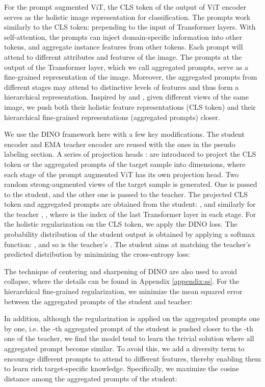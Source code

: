 \documentclass{article} \usepackage{iclr2023_conference,times}
\begin{document}
For the prompt augmented ViT, the CLS token of the output of ViT encoder  serves as the holistic image representation for classification. The prompts work similarly to the CLS token: prepending to the input of Transformer layers. With self-attention, the prompts can inject domain-specific information into other tokens, and aggregate instance features from other tokens. Each prompt will attend to different attributes and features of the image. The prompts at the output of the Transformer layer, which we call aggregated prompts, serve as a fine-grained representation of the image. Moreover, the aggregated prompts from different stages may attend to distinctive levels of features and thus form a hierarchical representation. Inspired by \citet{caron2021emerging} and \citet{grill2020bootstrap}, given different views of the same image, we push both their holistic feature representations (CLS token) and their hierarchical fine-grained representations (aggregated prompts) closer.

We use the DINO \citep{caron2021emerging} framework here with a few key modifications. The student encoder  and EMA teacher encoder  are reused with the ones in the pseudo labeling section. A series of projection heads :  are introduced to project the CLS token  or the aggregated prompts  of the target sample  into  dimensions, where each stage of the prompt augmented ViT has its own projection head. Two random strong-augmented views of the target sample is generated. One is passed to the student, and the other one is passed to the teacher. The projected CLS token and aggregated prompts are obtained from the student: ,  and similarly for the teacher , , where  is the index of the last Transformer layer in each stage. For the holistic regularization on the CLS token, we apply the DINO loss. The probability distribution of the student output is obtained by applying a softmax function: , and so is the teacher's .  The student aims at matching the teacher's predicted distribution by minimizing the cross-entropy loss:

The technique of centering and sharpening of DINO are also used to avoid collapse, where the details can be found in Appendix \ref{appendix:ss}.
For the hierarchical fine-grained regularization, we minimize the mean squared error between the aggregated prompts of the student and teacher:

In addition, although the regularization is applied on the aggregated prompts one by one, i.e. the -th aggregated prompt of the student is pushed closer to the -th one of the teacher, we find the model tend to learn the trivial solution where all aggregated prompt become similar. To avoid this, we add a diversity term to encourage different prompts to attend to different features, thereby enabling them to learn rich target-specific knowledge. 
Specifically, we maximize the cosine distance among the  aggregated prompts of the student:
\end{document}
